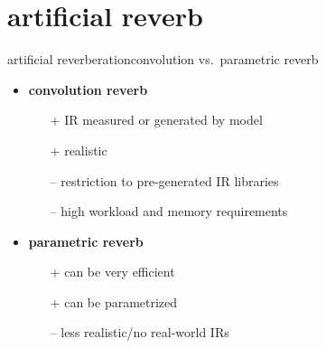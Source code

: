 \section{artificial reverb}
\begin{frame}{artificial reverberation}{convolution vs.\ parametric reverb}
    \begin{itemize}
        \item   \textbf{convolution reverb}
            \begin{itemize}
                \item[+]   IR measured or generated by model
                \item[+]   realistic
                \item[--]  restriction to pre-generated IR libraries
                \item[--]  high workload and memory requirements
            \end{itemize}
        \bigskip
        \item   \textbf{parametric reverb}
            \begin{itemize}
                \item[+]   can be very efficient
                \item[+]   can be parametrized
                \item[--]  less realistic/no real-world IRs
            \end{itemize}
    \end{itemize}
\end{frame}

